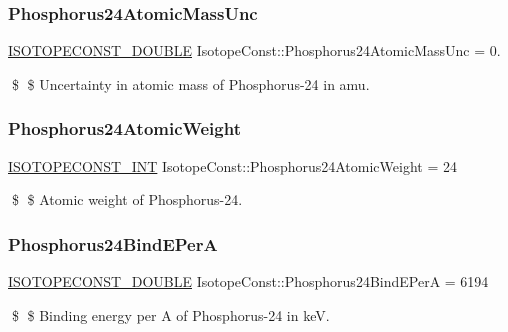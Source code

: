 \subsubsection{\texorpdfstring{Phosphorus24\+Atomic\+Mass\+Unc}{Phosphorus24AtomicMassUnc}}
{\footnotesize\ttfamily \mbox{\hyperlink{group___isotope_const-_macros_ga8f45a7272ce02c0b4c65c44636ed719a}{I\+S\+O\+T\+O\+P\+E\+C\+O\+N\+S\+T\+\_\+\+D\+O\+U\+B\+LE}} Isotope\+Const\+::\+Phosphorus24\+Atomic\+Mass\+Unc = 0.}

\$ \$ Uncertainty in atomic mass of Phosphorus-\/24 in amu. \mbox{\label{group___isotope_const-_phosphorus-_p24_gab0cbc8374ef5bfbd898d1c0a18e845ae}} 
\subsubsection{\texorpdfstring{Phosphorus24\+Atomic\+Weight}{Phosphorus24AtomicWeight}}
{\footnotesize\ttfamily \mbox{\hyperlink{group___isotope_const-_macros_ga5f18360b3e99483a35c32d789e62621c}{I\+S\+O\+T\+O\+P\+E\+C\+O\+N\+S\+T\+\_\+\+I\+NT}} Isotope\+Const\+::\+Phosphorus24\+Atomic\+Weight = 24}

\$ \$ Atomic weight of Phosphorus-\/24. \mbox{\label{group___isotope_const-_phosphorus-_p24_ga1ffca3220e543b447e36ea9f89910de5}} 
\subsubsection{\texorpdfstring{Phosphorus24\+Bind\+E\+PerA}{Phosphorus24BindEPerA}}
{\footnotesize\ttfamily \mbox{\hyperlink{group___isotope_const-_macros_ga8f45a7272ce02c0b4c65c44636ed719a}{I\+S\+O\+T\+O\+P\+E\+C\+O\+N\+S\+T\+\_\+\+D\+O\+U\+B\+LE}} Isotope\+Const\+::\+Phosphorus24\+Bind\+E\+PerA = 6194}

\$ \$ Binding energy per A of Phosphorus-\/24 in keV. \mbox{\label{group___isotope_const-_phosphorus-_p24_gafcc1bdaa3812c754e61f00c7797df439}} 
